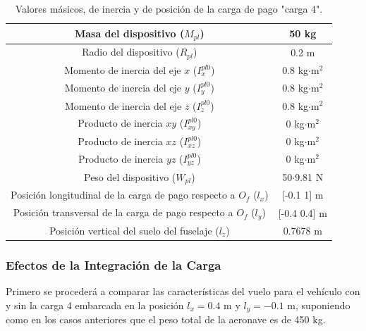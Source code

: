 \begin{table}[htbp]
	\centering
	\begin{tabular}{|>{\columncolor{Gray}}c|c|}
		\hline
		\cellcolor{Gray}Masa del dispositivo ($M_{pl}$) & 50 kg \\ \hline
		\cellcolor{Gray}Radio del dispositivo ($R_{pl}$) & 0.2 m \\ \hline
		\cellcolor{Gray}Momento de inercia del eje $x$ ($I_{x}^{pl0}$) & 0.8 kg$\cdot$m$^2$ \\ \hline
		\cellcolor{Gray}Momento de inercia del eje $y$ ($I_{y}^{pl0}$) & 0.8 kg$\cdot$m$^2$ \\ \hline
		\cellcolor{Gray}Momento de inercia del eje $z$ ($I_{z}^{pl0}$) & 0.8 kg$\cdot$m$^2$ \\ \hline
		\cellcolor{Gray}Producto de inercia $xy$ ($I_{xy}^{pl0}$)& 0 kg$\cdot$m$^2$ \\ \hline
		\cellcolor{Gray}Producto de inercia $xz$ ($I_{xz}^{pl0}$)& 0 kg$\cdot$m$^2$ \\ \hline
		\cellcolor{Gray}Producto de inercia $yz$ ($I_{yz}^{pl0}$)& 0 kg$\cdot$m$^2$ \\ \hline
		\cellcolor{Gray}Peso del dispositivo ($W_{pl}$)& 50$\cdot$9.81 N \\ \hline
		\cellcolor{Gray}Posición longitudinal de la carga de pago respecto a $O_f$ ($l_x$) & [-0.1 1] m \\ \hline
		\cellcolor{Gray}Posición transversal de la carga de pago respecto a $O_f$ ($l_y$) & [-0.4 0.4] m \\ \hline
		\cellcolor{Gray}Posición vertical del suelo del fuselaje ($l_z$) & 0.7678 m \\ \hline
	\end{tabular}%
	\caption{Valores másicos, de inercia y de posición de la carga de pago "carga 4".}
	\label{carga4}
\end{table}%
\subsubsection*{Efectos de la Integración de la Carga}

Primero se procederá a comparar las características del vuelo para el vehículo con y sin la carga 4 embarcada en la posición $l_x=0.4$ m y $l_y=-0.1$ m, suponiendo como en los casos anteriores que el peso total de la aeronave es de 450 kg.

